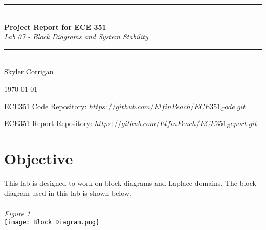 \documentclass[12pt,a4paper]{article}
\newcommand{\HRule}{\rule{\linewidth}{0.5mm}}
\begin{document}
\begin{titlepage}
\begin{center}



\HRule \\[0.4cm]
{ \LARGE 
  \textbf{Project Report for ECE 351}\\[0.4cm]
  \emph{Lab 07 - Block Diagrams and System Stability}\\[0.4cm]
}
\HRule \\[1.5cm]



{ \large
  Skyler Corrigan \\[0.1cm]
}

\vfill



{\large \today}

{ \large
ECE351 Code Repository: 
\hyperlink{$https://github.com/ElfinPeach/ECE351_Code.git$}{$https://github.com/ElfinPeach/ECE351_Code.git$}

ECE351 Report Repository: 
\hyperlink{$https://github.com/ElfinPeach/ECE351_Report.git$}{$https://github.com/ElfinPeach/ECE351_Report.git$}
}
 
\end{center}
\end{titlepage}


\newpage

\tableofcontents
{}
\newpage
\setcounter{page}{1}

\section{Objective}
This lab is designed to work on block diagrams and Laplace domains. The block diagram used in this lab is shown below.\\
\\
\textit{Figure 1}
\\
\texttt{[image: Block Diagram.png]}
\\
\end{document}
